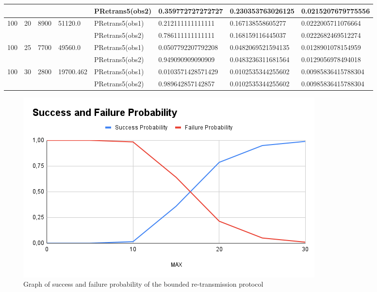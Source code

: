 \begin{table}[H]
{\begin{tabular}{|l|l|l|l|l|l|l|l|}
                     &                     &                        &                            & PRetrans5(obs2) & 0.359772727272727  & 0.230353763026125  & 0.0215207679775556  \\ \hline
\multirow{2}{*}{100} & \multirow{2}{*}{20} & \multirow{2}{*}{8900}  & \multirow{2}{*}{51120.0}   & PRetrans5(obs1) & 0.212111111111111  & 0.167138558605277  & 0.0222005711076664  \\ \cline{5-8} 
                     &                     &                        &                            & PRetrans5(obs2) & 0.786111111111111  & 0.168159116445037  & 0.0222682469512274  \\ \hline
\multirow{2}{*}{100} & \multirow{2}{*}{25} & \multirow{2}{*}{7700}  & \multirow{2}{*}{49560.0}   & PRetrans5(obs1) & 0.0507792207792208 & 0.0482069521594135 & 0.0128901078154959  \\ \cline{5-8} 
                     &                     &                        &                            & PRetrans5(obs2) & 0.949090909090909  & 0.0483236311681564 & 0.0129056978494018  \\ \hline
\multirow{2}{*}{100} & \multirow{2}{*}{30} & \multirow{2}{*}{2800}  & \multirow{2}{*}{19700.462} & PRetrans5(obs1) & 0.0103571428571429 & 0.0102535344255602 & 0.00985836415788304 \\ \cline{5-8} 
                     &                     &                        &                            & PRetrans5(obs2) & 0.989642857142857  & 0.0102535344255602 & 0.00985836415788304 \\ \hline
\end{tabular}
}
\end{table}

\begin{figure}[H]
    \centering
    \includegraphics[scale = 0.5]{images/CS9.png}
    \caption{Graph of success and failure probability of the bounded re-transmission protocol}
    \label{fig:cs9}
\end{figure}

